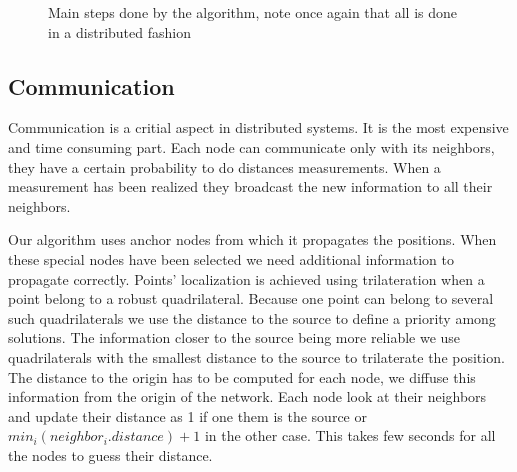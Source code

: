 \documentclass[letterpaper, 10 pt, conference]{ieeeconf}  %
\begin{document}
   \begin{figure}[thpb]
      \centering
      \caption{Main steps done by the algorithm, note once again that all is done in a distributed fashion}
      \label{figurelabel}
   \end{figure}




%

\subsection{Communication}
Communication is a critial aspect in distributed systems. It is the most expensive and time consuming part. Each node can communicate only with its neighbors, they have a certain probability to do distances measurements. When a measurement has been realized they broadcast the new information to all their neighbors.

Our algorithm uses anchor nodes from which it propagates the positions. When these special nodes have been selected we need additional information to propagate correctly. Points' localization is achieved using trilateration when a point belong to a robust quadrilateral. Because one point can belong to several such quadrilaterals we use the distance to the source to define a priority among solutions. The information closer to the source being more reliable we use quadrilaterals with the smallest distance to the source to trilaterate the position. The distance to the origin has to be computed for each node, we diffuse this information from the origin of the network. Each node look at their neighbors and update their distance as 1 if one them is the source or $min_i(neighbor_i.distance) +1 $ in the other case. This takes few seconds for all the nodes to guess their distance.
\end{document}
